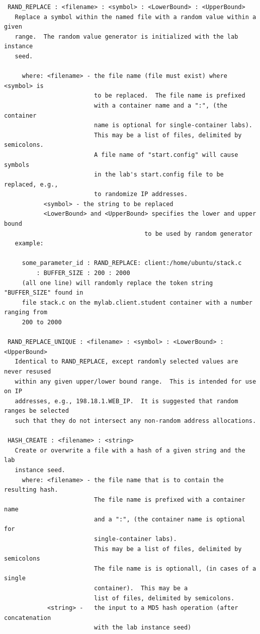 \documentclass[12pt]{article}
\begin{document}
\begin{verbatim}
 RAND_REPLACE : <filename> : <symbol> : <LowerBound> : <UpperBound>
   Replace a symbol within the named file with a random value within a given
   range.  The random value generator is initialized with the lab instance
   seed.

     where: <filename> - the file name (file must exist) where <symbol> is 
                         to be replaced.  The file name is prefixed 
                         with a container name and a ":", (the container 
                         name is optional for single-container labs).  
                         This may be a list of files, delimited by semicolons. 
                         A file name of "start.config" will cause symbols
                         in the lab's start.config file to be replaced, e.g.,
                         to randomize IP addresses.
           <symbol> - the string to be replaced
           <LowerBound> and <UpperBound> specifies the lower and upper bound
                                       to be used by random generator
   example:

     some_parameter_id : RAND_REPLACE: client:/home/ubuntu/stack.c 
         : BUFFER_SIZE : 200 : 2000
     (all one line) will randomly replace the token string "BUFFER_SIZE" found in
     file stack.c on the mylab.client.student container with a number ranging from 
     200 to 2000

 RAND_REPLACE_UNIQUE : <filename> : <symbol> : <LowerBound> : <UpperBound>
   Identical to RAND_REPLACE, except randomly selected values are never resused
   within any given upper/lower bound range.  This is intended for use on IP
   addresses, e.g., 198.18.1.WEB_IP.  It is suggested that random ranges be selected
   such that they do not intersect any non-random address allocations.
 
 HASH_CREATE : <filename> : <string>
   Create or overwrite a file with a hash of a given string and the lab 
   instance seed.
     where: <filename> - the file name that is to contain the resulting hash.
                         The file name is prefixed with a container name 
                         and a ":", (the container name is optional for 
                         single-container labs).  
                         This may be a list of files, delimited by semicolons 
                         The file name is is optionall, (in cases of a single
                         container).  This may be a 
                         list of files, delimited by semicolons.
            <string> -   the input to a MD5 hash operation (after concatenation 
                         with the lab instance seed)
                       

\end{verbatim}
\end{document}
